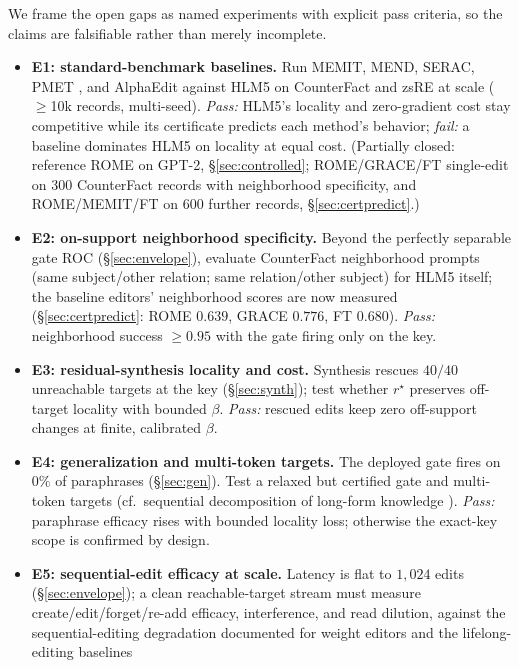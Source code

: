 \documentclass[11pt]{article}
\theoremstyle{remark}
\begin{document}
We frame the open gaps as named experiments with explicit pass criteria, so the
claims are falsifiable rather than merely incomplete.

\begin{itemize}
  \item \textbf{E1: standard-benchmark baselines.} Run MEMIT, MEND, SERAC,
  PMET \citep{li2024pmet}, and AlphaEdit \citep{fang2025alphaedit} against HLM5
  on CounterFact and zsRE at scale ($\ge$10k records, multi-seed).
  \emph{Pass:} HLM5's locality and zero-gradient cost stay competitive while its
  certificate predicts each method's behavior; \emph{fail:} a baseline
  dominates HLM5 on locality at equal cost. (Partially closed: reference ROME on
  GPT-2, \S\ref{sec:controlled}; ROME/GRACE/FT single-edit on $300$ CounterFact
  records with neighborhood specificity, and ROME/MEMIT/FT on $600$ further
  records, \S\ref{sec:certpredict}.)
  \item \textbf{E2: on-support neighborhood specificity.} Beyond the perfectly
  separable gate ROC (\S\ref{sec:envelope}), evaluate CounterFact neighborhood
  prompts (same subject/other relation; same relation/other subject) for HLM5
  itself; the baseline editors' neighborhood scores are now measured
  (\S\ref{sec:certpredict}: ROME $0.639$, GRACE $0.776$, FT $0.680$).
  \emph{Pass:} neighborhood success $\ge0.95$ with the gate firing only on the key.
  \item \textbf{E3: residual-synthesis locality and cost.} Synthesis rescues
  $40/40$ unreachable targets at the key (\S\ref{sec:synth}); test whether
  $r^{\star}$ preserves off-target locality with bounded $\beta$. \emph{Pass:}
  rescued edits keep zero off-support changes at finite, calibrated $\beta$.
  \item \textbf{E4: generalization and multi-token targets.} The deployed gate
  fires on $0\%$ of paraphrases (\S\ref{sec:gen}). Test a relaxed but certified gate
  and multi-token targets (cf.\ sequential decomposition of long-form knowledge
  \citep{jiang2025anyedit}). \emph{Pass:} paraphrase efficacy rises with bounded
  locality loss; otherwise the exact-key scope is confirmed by design.
  \item \textbf{E5: sequential-edit efficacy at scale.} Latency is flat to
  $1{,}024$ edits (\S\ref{sec:envelope}); a clean reachable-target stream must
  measure create/edit/forget/re-add efficacy, interference, and read dilution,
  against the sequential-editing degradation documented for weight editors
  \citep{gupta2024forgetting} and the lifelong-editing baselines

\end{itemize}
\end{document}
